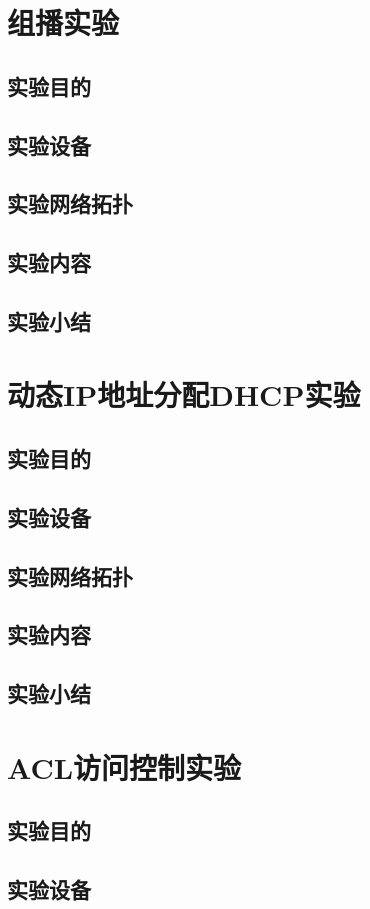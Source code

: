 \documentclass[lang=cn,11pt,a4paper,cite=authoryear]{elegantpaper}
\begin{document}
\section{组播实验}
\subsection{实验目的}
\subsection{实验设备}
\subsection{实验网络拓扑}
\subsection{实验内容}
\subsection{实验小结}
\section{动态IP地址分配DHCP实验}
\subsection{实验目的}
\subsection{实验设备}
\subsection{实验网络拓扑}
\subsection{实验内容}
\subsection{实验小结}
\section{ACL访问控制实验}
\subsection{实验目的}
\subsection{实验设备}
\end{document}
